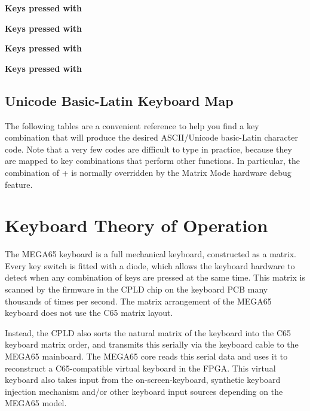 \begin{minipage}{\textwidth}
\bf{Keys pressed with }

\end{minipage}

\begin{minipage}{\textwidth}
\bf{Keys pressed with }

\end{minipage}

\begin{minipage}{\textwidth}
\bf{Keys pressed with \megasymbolkey}

\end{minipage}

\begin{minipage}{\textwidth}
\bf{Keys pressed with }

\end{minipage}

\subsection{Unicode Basic-Latin Keyboard Map}

The following tables are a convenient reference to help you find a key combination
that will produce the desired ASCII/Unicode basic-Latin character code.  Note that
a very few codes are difficult to type in practice, because they are mapped to
key combinations that perform other functions. In particular, the combination of
\megasymbol +  is normally overridden by the Matrix Mode hardware
debug feature.




\section{Keyboard Theory of Operation}

The MEGA65 keyboard is a full mechanical keyboard, constructed as a matrix. Every
key switch is fitted with a diode, which allows the keyboard hardware to detect
when any combination of keys are pressed at the same time.  This matrix is scanned
by the firmware in the CPLD chip on the keyboard PCB many thousands of times per
second.  The matrix arrangement of the MEGA65 keyboard does not use the C65
matrix layout.

Instead, the CPLD also sorts the natural matrix of the keyboard
into the C65 keyboard matrix order, and transmits this serially via the keyboard
cable to the MEGA65 mainboard.  The MEGA65 core reads this serial data and uses it
to reconstruct a C65-compatible virtual keyboard in the FPGA.  This virtual keyboard
also takes input from the on-screen-keyboard, synthetic keyboard injection mechanism
and/or other keyboard input sources depending on the MEGA65 model.

